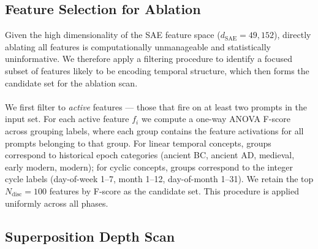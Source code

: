 \documentclass[11pt]{article}
\begin{document}
\subsection{Feature Selection for Ablation}
\label{sec:feature-selection}
Given the high dimensionality of the SAE feature space ($d_\text{SAE} = 49,152$), directly ablating all features is computationally unmanageable and
statistically uninformative. We therefore apply a filtering procedure to identify a focused subset of features likely to be encoding temporal
structure, which then forms the candidate set for the ablation scan.
\\
\\
We first filter to \textit{active} features --- those that fire on at least two prompts in the input set. For each active feature
$f_i$ we compute a one-way ANOVA F-score across grouping labels, where each group contains the feature activations for all prompts belonging to that
group. For linear temporal concepts, groups correspond to historical epoch categories (ancient BC, ancient AD, medieval, early modern, modern);
for cyclic concepts, groups correspond to the integer cycle labels (day-of-week 1--7, month 1--12, day-of-month 1--31).
We retain the top $N_{\text{disc}} = 100$ features by F-score as the candidate set. This procedure is applied uniformly across all phases.


\subsection{Superposition Depth Scan}
\end{document}
